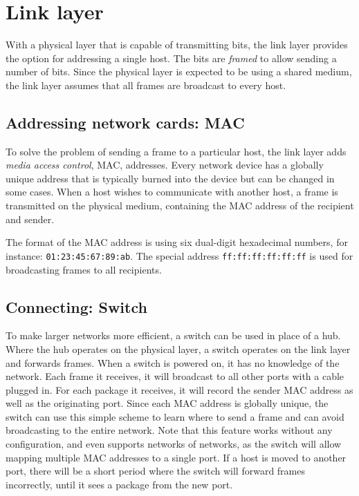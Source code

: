 \section{Link layer}

With a physical layer that is capable of transmitting bits, the link layer provides the option for addressing a single host. The bits are \emph{framed} to allow sending a number of bits. Since the physical layer is expected to be using a shared medium, the link layer assumes that all frames are broadcast to every host.

\subsection{Addressing network cards: MAC}
To solve the problem of sending a frame to a particular host, the link layer adds \emph{media access control}, MAC, addresses. Every network device has a globally unique address that is typically burned into the device but can be changed in some cases. When a host wishes to communicate with another host, a frame is transmitted on the physical medium, containing the MAC address of the recipient and sender.

The format of the MAC address is using six dual-digit hexadecimal numbers, for instance: \texttt{01:23:45:67:89:ab}. The special address \texttt{ff:ff:ff:ff:ff:ff} is used for broadcasting frames to all recipients.

\subsection{Connecting: Switch}
To make larger networks more efficient, a switch can be used in place of a hub. Where the hub operates on the physical layer, a switch operates on the link layer and forwards frames. When a switch is powered on, it has no knowledge of the network. Each frame it receives, it will broadcast to all other ports with a cable plugged in. For each package it receives, it will record the sender MAC address as well as the originating port. Since each MAC address is globally unique, the switch can use this simple scheme to learn where to send a frame and can avoid broadcasting to the entire network. Note that this feature works without any configuration, and even supports networks of networks, as the switch will allow mapping multiple MAC addresses to a single port. If a host is moved to another port, there will be a short period where the switch will forward frames incorrectly, until it sees a package from the new port.

